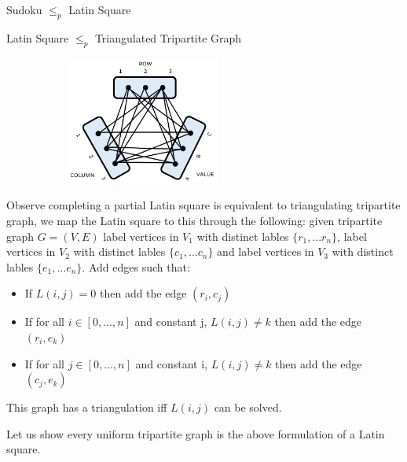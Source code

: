 \documentclass[final]{beamer}
\newlength{\colwidth}
\newcounter{row}
\newcounter{col}
\newcounter{rowa}
\newcounter{cola}
\newcommand\setrowa[3]{
  \setcounter{cola}{1}
  \foreach \n in {#1, #2, #3} {
    \edef\x{\value{cola} - 0.5}
    \edef\y{3.5 - \value{rowa}}
    \node[anchor=center] at (\x, \y) {\n};
    \stepcounter{cola}
  }
  \stepcounter{rowa}
}
\begin{document}
\begin{frame}[t]
\begin{columns}[t]
\begin{column}{\colwidth}
\begin{block}{Sudoku $\leq_p$ Latin Square}
  \end{block}
  \begin{block}{Latin Square $\leq_p$ Triangulated Tripartite Graph}

\begin{figure}
\begin{figure}
		\includegraphics[width=50mm]{ttg.png}
\end{figure}
\end{figure}

Observe completing a partial Latin square is equivalent to triangulating tripartite graph, we map the Latin square to this through the following: 
given tripartite graph $G=(V,E)$ label vertices in $V_1$ with distinct lables $\{r_1,...r_n\}$, label vertices in $V_2$ with distinct lables $\{c_1,...c_n\}$ and label vertices in $V_3$ with distinct lables $\{e_1,...e_n\}$. Add edges such that:
\begin{itemize}
\item{If $L(i,j) = 0$ then add the edge $(r_i,c_j)$ }
\item{If for all $i \in [0,...,n]$ and constant j, $L(i,j) \neq k$ then add the edge $(r_i,e_k)$}
\item{If for all $j \in [0,...,n]$ and constant i, $L(i,j) \neq k$ then add the edge $(c_j,e_k)$}
\end{itemize}
This graph has a triangulation iff $L(i,j)$ can be solved.

Let us show every uniform tripartite graph is the above formulation of a Latin square.

\begin{figure}
\end{figure}


\end{block}
\end{column}
\end{columns}
\end{frame}
\end{document}
